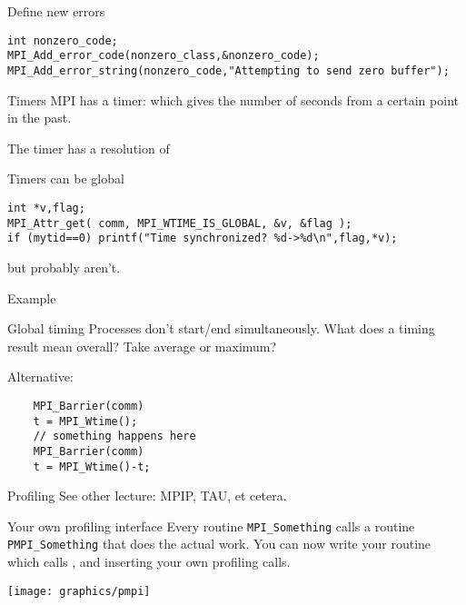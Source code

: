 \begin{numberedframe}{Define new errors}
\begin{lstlisting}
int nonzero_code;
MPI_Add_error_code(nonzero_class,&nonzero_code);
MPI_Add_error_string(nonzero_code,"Attempting to send zero buffer");
\end{lstlisting}
\end{numberedframe}


\begin{numberedframe}{Timers}
  MPI has a  timer: 
  which gives the number of seconds from a certain point in the past.

  The timer has a resolution of 

  Timers can be global
\begin{lstlisting}
int *v,flag;
MPI_Attr_get( comm, MPI_WTIME_IS_GLOBAL, &v, &flag );
if (mytid==0) printf("Time synchronized? %d->%d\n",flag,*v);
\end{lstlisting}
  but probably aren't.
\end{numberedframe}

\begin{numberedframe}{Example}
\end{numberedframe}

\begin{numberedframe}{Global timing}
  Processes don't start/end simultaneously. What does a timing result
  mean overall? Take average or maximum?

  Alternative:
  \begin{lstlisting}
    MPI_Barrier(comm)
    t = MPI_Wtime();
    // something happens here
    MPI_Barrier(comm)
    t = MPI_Wtime()-t;
  \end{lstlisting}
\end{numberedframe}

\begin{numberedframe}{Profiling}
  See other lecture: 
  MPIP, TAU, et cetera.
\end{numberedframe}

\begin{numberedframe}{Your own profiling interface}
  Every routine \lstinline{MPI_Something} calls a routine \lstinline{PMPI_Something} that 
  does the actual work. You can now write your  routine
  which calls , and inserting your own profiling calls.

  \texttt{[image: graphics/pmpi]}
\end{numberedframe}

